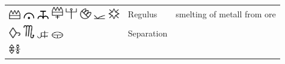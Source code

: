 \documentclass[british,final,landscape]{scrartcl}
\begin{document}
\begin{refsection}
\begin{supertabular}{p{0.3\textwidth}p{0.34\textwidth}p{0.34\textwidth}}
   \includegraphics[width=5mm]{Process/Regulus} \includegraphics[width=5mm]{Process/Regulus2} \includegraphics[width=5mm]{Process/Regulus3} \includegraphics[width=5mm]{Process/Regulus4} \includegraphics[width=5mm]{Process/Regulus5} \includegraphics[width=5mm]{Process/Regulus6} \includegraphics[width=5mm]{Process/Regulus7} \includegraphics[width=5mm]{Process/Regulus8} & Regulus & smelting of metall from ore\\
   \includegraphics[width=5mm]{Process/Separation} \includegraphics[width=5mm]{Process/Separation2} \includegraphics[width=5mm]{Process/Separation3} \includegraphics[width=5mm]{Process/Separation4} & Separation & \\
   \includegraphics[width=5mm]{Process/SolveCoagulo} &  & \\

\end{supertabular}
\end{refsection}
\end{document}

